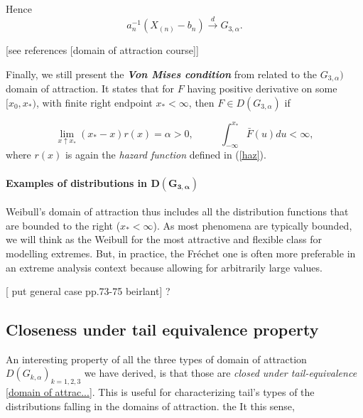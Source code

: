 \documentclass[11pt,a4paper,openany ]{book}
\begin{document}
Hence
\begin{equation*}
a^{-1}_n(X_{(n)}-b_n)\stackrel{d}{\rightarrow}G_{3,\alpha}.
\end{equation*}

[see references [domain of attraction course]]

Finally, we still present the \emph{\textbf{Von Mises condition}} from \cite{falk_von_1993} related to the $G_{3,\alpha})$ domain of attraction. It states that for $F$ having positive derivative on some $[x_0,x_*)$, with finite right endpoint $x_*<\infty$, then $F\in D(G_{3,\alpha})$ if

\begin{equation}
\displaystyle{\lim_{ x  \uparrow  x_*}}(x_*-x)r(x)=\alpha >0, \ \ \ \ \ \ \ \ \ \     \ \
\int^{x_*}_{-\infty} \bar{F}(u)du<\infty,
\end{equation}
where $r(x)$ is again the \emph{hazard function} defined in (\ref{haz}).

\paragraph*{Examples of distributions in $\boldsymbol{D(G_{3,\alpha})}$} Weibull's domain of attraction thus includes all the distribution functions that are bounded to the right ($x_*<\infty$). As most phenomena are typically bounded, we will think as the Weibull for the most attractive and flexible class for modelling extremes. But, in practice, the Fréchet one is often more preferable in an extreme analysis context because allowing for arbitrarily large values.
\newline


[ put general case pp.73-75 beirlant] ?
\newline

\subsection{Closeness under tail equivalence property} An interesting property of all the three types of domain of attraction $D(G_{k,\alpha})_{k=1,2,3}$ we have derived, is that those are \emph{closed under tail-equivalence} \ref{domain of attrac...}. This is useful for characterizing tail's types of the distributions falling in the domains of attraction. the  It this sense,
\end{document}

